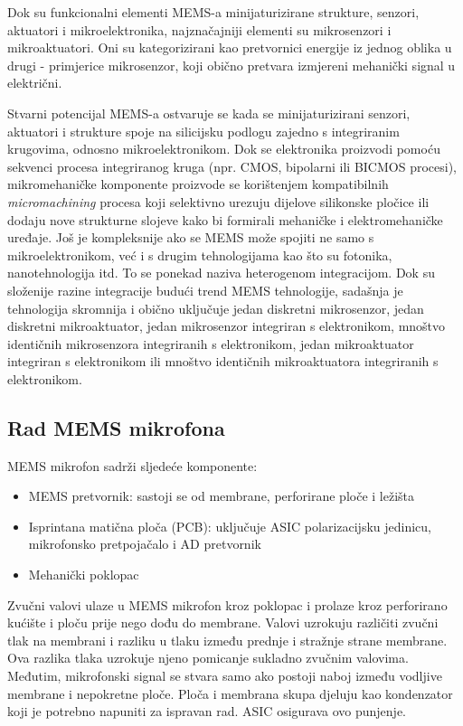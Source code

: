 Dok su funkcionalni elementi MEMS-a minijaturizirane strukture, senzori, aktuatori i mikroelektronika, najznačajniji elementi su mikrosenzori i mikroaktuatori. Oni su  kategorizirani kao pretvornici energije iz jednog oblika u drugi - primjerice mikrosenzor, koji obično pretvara izmjereni mehanički signal u električni.

Stvarni potencijal MEMS-a ostvaruje se kada se minijaturizirani senzori, aktuatori i strukture spoje na silicijsku podlogu zajedno s integriranim krugovima, odnosno mikroelektronikom. Dok se elektronika proizvodi pomoću sekvenci procesa integriranog kruga (npr. CMOS, bipolarni ili BICMOS procesi), mikromehaničke komponente proizvode se korištenjem kompatibilnih \textit{micromachining} procesa koji selektivno urezuju dijelove silikonske pločice ili dodaju nove strukturne slojeve kako bi formirali mehaničke i elektromehaničke uređaje. Još je kompleksnije ako se MEMS može spojiti ne samo s mikroelektronikom, već i s drugim tehnologijama kao što su fotonika, nanotehnologija itd. To se ponekad naziva heterogenom integracijom. Dok su složenije razine integracije budući trend MEMS tehnologije, sadašnja je tehnologija skromnija i obično uključuje jedan diskretni mikrosenzor, jedan diskretni mikroaktuator, jedan mikrosenzor integriran s elektronikom, mnoštvo identičnih mikrosenzora integriranih s elektronikom, jedan mikroaktuator integriran s elektronikom ili mnoštvo identičnih mikroaktuatora integriranih s elektronikom. 
 

\subsection{Rad MEMS mikrofona}

MEMS mikrofon sadrži sljedeće komponente:
\begin{itemize}
	\item MEMS pretvornik: sastoji se od membrane, perforirane ploče i ležišta
	\item Isprintana matična ploča (PCB): uključuje ASIC polarizacijsku jedinicu, mikrofonsko pretpojačalo i AD pretvornik
	\item Mehanički poklopac
\end{itemize}

Zvučni valovi ulaze u MEMS mikrofon kroz poklopac i prolaze kroz perforirano kućište i ploču prije nego dođu do membrane. Valovi uzrokuju različiti zvučni tlak na membrani i razliku u tlaku između prednje i stražnje strane membrane. Ova razlika tlaka uzrokuje njeno pomicanje sukladno zvučnim valovima. Međutim, mikrofonski signal se stvara samo ako postoji naboj između vodljive membrane i nepokretne ploče. Ploča i membrana skupa djeluju kao kondenzator koji je potrebno napuniti za ispravan rad. ASIC osigurava ovo punjenje.

